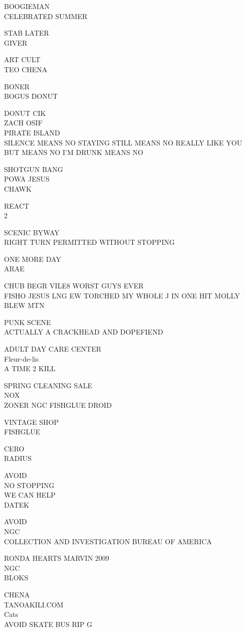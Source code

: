 \documentclass[10pt,letterpaper]{article}
\begin{document}
BOOGIEMAN\\
CELEBRATED SUMMER

STAB LATER\\
GIVER

ART CULT\\
TEO CHENA

BONER\\
BOGUS DONUT

DONUT CIK\\
ZACH OSIF\\
PIRATE ISLAND\\
SILENCE MEANS NO STAYING STILL MEANS NO REALLY LIKE YOU BUT MEANS NO I'M DRUNK MEANS NO

SHOTGUN BANG\\
POWA JESUS\\
CHAWK

REACT\\
2

SCENIC BYWAY\\
RIGHT TURN PERMITTED WITHOUT STOPPING

ONE MORE DAY\\
ARAE

CHUB BEGR VILE8 WORST GUYS EVER\\
FISHO JESUS LNG EW TORCHED MY WHOLE J IN ONE HIT MOLLY BLEW MTN

PUNK SCENE\\
ACTUALLY A CRACKHEAD AND DOPEFIEND

ADULT DAY CARE CENTER\\
Fleur{-}de{-}lis\\
A TIME 2 KILL

SPRING CLEANING SALE\\
NOX\\
ZONER NGC FISHGLUE DROID

VINTAGE SHOP\\
FISHGLUE

CERO\\
RADIUS

AVOID\\
NO STOPPING\\
WE CAN HELP\\
DATEK

AVOID\\
NGC\\
COLLECTION AND INVESTIGATION BUREAU OF AMERICA

RONDA HEARTS MARVIN 2009\\
NGC\\
BLOKS

CHENA\\
TANOAKILI.COM\\
Cats\\
AVOID SKATE BUS RIP G
\end{document}
